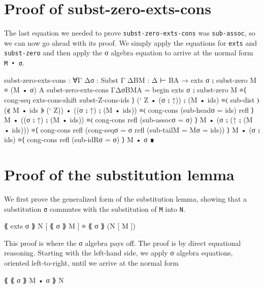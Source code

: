 \hypertarget{proof-of-subst-zero-exts-cons}{%
\section{Proof of
subst-zero-exts-cons}\label{proof-of-subst-zero-exts-cons}}

The last equation we needed to prove \texttt{subst-zero-exts-cons} was
\texttt{sub-assoc}, so we can now go ahead with its proof. We simply
apply the equations for \texttt{exts} and \texttt{subst-zero} and then
apply the σ algebra equation to arrive at the normal form
\texttt{M\ •\ σ}.

\begin{fence}
\begin{code}
subst-zero-exts-cons : ∀{Γ Δ}{σ : Subst Γ Δ}{B}{M : Δ ⊢ B}{A}
                     → exts σ ⨟ subst-zero M ≡ (M • σ) {A}
subst-zero-exts-cons {Γ}{Δ}{σ}{B}{M}{A} =
    begin
      exts σ ⨟ subst-zero M
    ≡⟨ cong-seq exts-cons-shift subst-Z-cons-ids ⟩
      (` Z • (σ ⨟ ↑)) ⨟ (M • ids)
    ≡⟨ sub-dist ⟩
      (⟪ M • ids ⟫ (` Z)) • ((σ ⨟ ↑) ⨟ (M • ids))
    ≡⟨ cong-cons (sub-head{σ = ids}) refl ⟩
      M • ((σ ⨟ ↑) ⨟ (M • ids))
    ≡⟨ cong-cons refl (sub-assoc{σ = σ}) ⟩
      M • (σ ⨟ (↑ ⨟ (M • ids)))
    ≡⟨ cong-cons refl (cong-seq{σ = σ} refl (sub-tail{M = M}{σ = ids})) ⟩
      M • (σ ⨟ ids)
    ≡⟨ cong-cons refl (sub-idR{σ = σ}) ⟩
      M • σ
    ∎
\end{code}
\end{fence}

\hypertarget{proof-of-the-substitution-lemma}{%
\section{Proof of the substitution
lemma}\label{proof-of-the-substitution-lemma}}

We first prove the generalized form of the substitution lemma, showing
that a substitution \texttt{σ} commutes with the substitution of
\texttt{M} into \texttt{N}.

\begin{myDisplay}
⟪ exts σ ⟫ N [ ⟪ σ ⟫ M ] ≡ ⟪ σ ⟫ (N [ M ])
\end{myDisplay}

This proof is where the σ algebra pays off. The proof is by direct
equational reasoning. Starting with the left-hand side, we apply σ
algebra equations, oriented left-to-right, until we arrive at the normal
form

\begin{myDisplay}
⟪ ⟪ σ ⟫ M • σ ⟫ N
\end{myDisplay}

